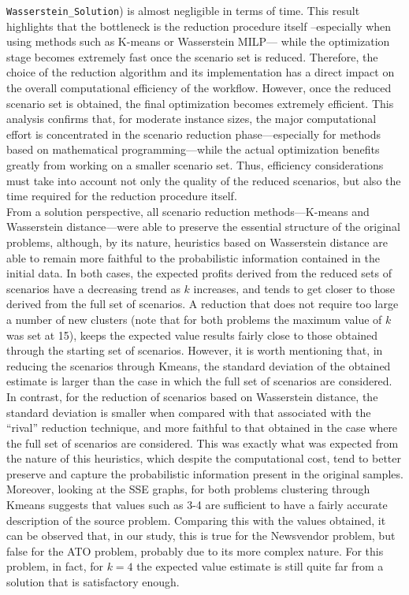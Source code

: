 \documentclass[a4paper,12pt]{article}
\begin{document}
	\texttt{Wasserstein\_Solution}) is almost negligible in terms of time. This result highlights that the bottleneck is the reduction procedure itself --especially when using methods such as K-means or Wasserstein MILP— while the optimization stage becomes extremely fast once the scenario set is reduced. Therefore, the choice of the reduction algorithm and its implementation has a direct impact on the overall computational efficiency of the workflow. However, once the reduced scenario set is obtained, the final optimization becomes extremely efficient. This analysis confirms that, for moderate instance sizes, the major computational effort is concentrated in the scenario reduction phase—especially for methods based on mathematical programming—while the actual optimization benefits greatly from working on a smaller scenario set. Thus, efficiency considerations must take into account not only the quality of the reduced scenarios, but also the time required for the reduction procedure itself. \\
	
	
\noindent	From a solution perspective, all scenario reduction methods—K-means and Wasserstein distance—were able to preserve the essential structure of the original problems, although, by its nature, heuristics based on Wasserstein distance are able to remain more faithful to the probabilistic information contained in the initial data. In both cases, the expected profits derived from the reduced sets of scenarios have a decreasing trend as $k$ increases, and tends to get closer to those derived from the full set of scenarios. A reduction that does not require too large a number of new clusters (note that for both problems the maximum value of $k$ was set at 15), keeps the expected value results fairly close to those obtained through the starting set of scenarios. However, it is worth mentioning that, in reducing the scenarios through Kmeans, the standard deviation of the obtained estimate is larger than the case in which the full set of scenarios are considered. In contrast, for the reduction of scenarios based on Wasserstein distance, the standard deviation is smaller when compared with that associated with the “rival” reduction technique, and more faithful to that obtained in the case where the full set of scenarios are considered. This was exactly what was expected from the nature of this heuristics, which despite the computational cost, tend to better preserve and capture the probabilistic information present in the original samples. Moreover, looking at the SSE graphs, for both problems clustering through Kmeans suggests that values such as 3-4 are sufficient to have a fairly accurate description of the source problem. Comparing this with the values obtained, it can be observed that, in our study, this is true for the Newsvendor problem, but false for the ATO problem, probably due to its more complex nature. For this problem, in fact, for $k = 4$ the expected value estimate is still quite far from a solution that is satisfactory enough.\\
	
\end{document}
